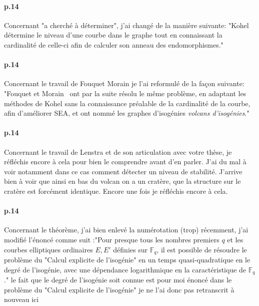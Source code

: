 \documentclass[10pt,a4paper]{article}
\theoremstyle{plain}
\theoremstyle{definition}
\theoremstyle{definition}
\theoremstyle{definition}
\theoremstyle{definition}
\theoremstyle{definition}
\theoremstyle{remark}
\theoremstyle{remark}
\theoremstyle{definition}
\begin{document}
\paragraph{p.14}{Concernant "a cherché à déterminer", j'ai changé de la manière suivante: "Kohel détermine le niveau d'une courbe dans le graphe tout en 
connaissant la cardinalité de celle-ci afin de calculer son anneau des 
endomorphismes."}

\paragraph{p.14}{Concernant le travail de Fouquet Morain je l'ai reformulé de la façon suivante: "Fouquet et Morain~\cite{FouquetMorain02} ont par la suite résolu le même 
problème, en adaptant les méthodes de Kohel sans la connaissance préalable de 
la cardinalité de la courbe, afin d'améliorer SEA, et ont nommé les graphes 
d'isogénies \emph{volcans d'isogénies}."}

\paragraph{p.14}{Concernant le travail de Lenstra et de son articulation avec votre thèse, je réfléchis encore à cela pour bien le comprendre avant d'en parler. J'ai du mal à voir notamment dans ce cas comment détecter un niveau de stabilité. J'arrive bien à voir que ainsi en bas du volcan on a un cratère, que la structure sur le cratère est forcément identique. Encore une fois je réfléchis encore à cela.}

\paragraph{p.14}{Concernant le théorème, j'ai bien enlevé la numérotation 
(trop) récemment, j'ai modifié l'énoncé comme suit :"Pour presque tous les 
nombres premiers $q$ et les courbes elliptiques ordinaires $E,E'$ définies sur
$\mathbb{F}_q$, il est possible de résoudre le problème du "Calcul explicite de
l'isogénie" en un temps quasi-quadratique en le degré de l'isogénie, 
avec une dépendance logarithmique en la caractéristique de $\mathbb{F}_q$." le 
fait que le degré de l'isogénie soit connue est pour moi énoncé dans le 
problème du "Calcul explicite de l'isogénie" je ne l'ai donc pas retranscrit à 
nouveau ici}
\end{document}
